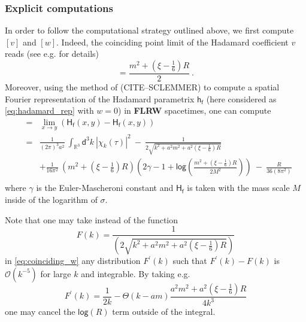 \documentclass[11pt]{book}
\renewcommand{\log}{\mathsf{log}}
\newcommand{\abs}[1]{\left|#1\right|}
\newcommand{\Ocal}{\mathcal{O}}
\newcommand{\Rbb}{\mathbb{R}}
\newcommand{\Hsf}{\mathsf{H}}
\newcommand{\dsf}{\mathsf{d}}
\newcommand{\fsf}{\mathsf{f}}
\newcommand{\hsf}{\mathsf{h}}
\theoremstyle{break}
\begin{document}
\subsubsection{Explicit computations}


In order to follow the computational strategy outlined above, we first compute $[v]$ and $[w]$.  Indeed, the coinciding point limit of the Hadamard coefficient $v$ reads (see e.g. \cite[Section III.1.2]{hack_backreaction_2010} for details)
%
\begin{equation*}
[v]=\frac{m^2+\left(\xi-\frac16\right)R}{2} \ .
\label{eq:coinciding_v}
\end{equation*}
%
Moreover, using the method of (CITE--SCLEMMER) to compute a spatial Fourier representation of the Hadamard parametrix $\hsf_\fsf$ (here considered as \eqref{eq:hadamard_rep} with $w=0$) in \textbf{FLRW} spacetimes, one can compute 
%
\begin{eqnarray}
[w] &=& \lim_{x\to y} \left(\Hsf_\fsf(x,y) - \Hsf_\fsf(x,y) \right) \nonumber \\
&=& \frac{1}{(2\pi)^3 a^2} \ \int_{\Rbb^3} \dsf^3k \ \abs{\chi_k(\tau)}^2 \ - \ \frac{1}{2\sqrt{k^2+a^2m^2+a^2\left(\xi-\frac16\right)R}} \nonumber \\
%
&& + \frac{1}{16\pi^2} \ \left(m^2+\left(\xi-\frac16\right)R\right)\left(2\gamma-1+\log\left(
\frac{m^2+\left(\xi-\frac16\right)R}{2M^2}\right)\right) \ - \ \frac{R}{36(8\pi^2)} \nonumber \\
\label{eq:coinciding_w} 
\end{eqnarray}
%
where $\gamma$ is the Euler-Mascheroni constant and $\Hsf_\fsf$ is taken with the mass scale $M$ inside of the logarithm of $\sigma$.


Note that one may take instead of the function 
%
\begin{equation*}
F(k) = \frac{1}{(2\sqrt{k^2+a^2m^2+a^2\left(\xi-\frac16\right)R})}
\end{equation*}
%
in \eqref{eq:coinciding_w} any distribution $F^\prime(k)$ such that $F^\prime(k)-F(k)$ is $\Ocal(k^{-5})$ for large $k$ and integrable. By taking e.g. 
%
\begin{equation*}
F^\prime(k) = \frac{1}{2k} - \Theta(k-am)\frac{a^2 m^2 + a^2 \left( \xi - \frac16 \right) R}{4k^3}
\end{equation*}
%
one may cancel the $\log\left(R\right)$ term outside of the integral.
\end{document}
